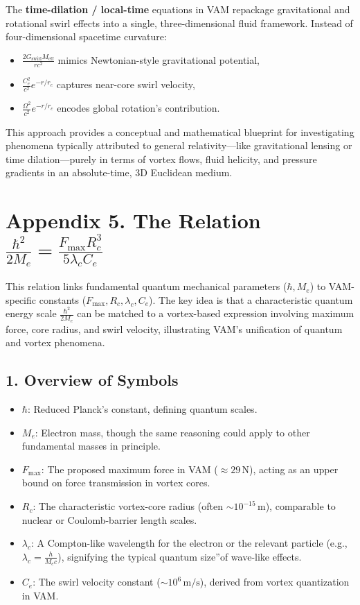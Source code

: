 \documentclass[a4paper,12pt]{article}
\begin{document}
The \textbf{time-dilation / local-time} equations in VAM repackage gravitational and rotational swirl effects into a single, three-dimensional fluid framework. Instead of four-dimensional spacetime curvature:
\begin{itemize}
    \item \(\tfrac{2 G_\text{swirl} M_\text{eff}}{r c^2}\) mimics Newtonian-style gravitational potential,
    \item \(\tfrac{C_e^2}{c^2} e^{-r/r_c}\) captures near-core swirl velocity,
    \item \(\tfrac{\Omega^2}{c^2} e^{-r/r_c}\) encodes global rotation's contribution.
\end{itemize}

This approach provides a conceptual and mathematical blueprint for investigating phenomena typically attributed to general relativity—like gravitational lensing or time dilation—purely in terms of vortex flows, fluid helicity, and pressure gradients in an absolute-time, 3D Euclidean medium.
\label{appendix:TimeDilation}


\section*{Appendix 5. The Relation \(\frac{\hbar^2}{2 M_e} = \frac{F_{\max} R_c^3}{5  \lambda_c  C_e} \)}

This relation links fundamental quantum mechanical parameters (\(\hbar, M_e\)) to VAM-specific constants (\(F_{\max}, R_c, \lambda_c, C_e\)). The key idea is that a characteristic quantum energy scale \(\tfrac{\hbar^2}{2M_e}\) can be matched to a vortex-based expression involving maximum force, core radius, and swirl velocity, illustrating VAM's unification of quantum and vortex phenomena.

\subsection*{1. Overview of Symbols}

\begin{itemize}
    \item \(\hbar\): Reduced Planck's constant, defining quantum scales.
    \item \(M_e\): Electron mass, though the same reasoning could apply to other fundamental masses in principle.
    \item \(F_{\max}\): The proposed maximum force in VAM (\(\approx 29\,\mathrm{N}\)), acting as an upper bound on force transmission in vortex cores.
    \item \(R_c\): The characteristic vortex-core radius (often \(\sim 10^{-15}\,\mathrm{m}\)), comparable to nuclear or Coulomb-barrier length scales.
    \item \(\lambda_c\): A Compton-like wavelength for the electron or the relevant particle (e.g., \(\lambda_c = \tfrac{h}{M_e c}\)), signifying the typical quantum \grqq size\textquotedblright of wave-like effects.
    \item \(C_e\): The swirl velocity constant (\(\sim 10^6\,\mathrm{m/s}\)), derived from vortex quantization in VAM.
\end{itemize}
\end{document}
